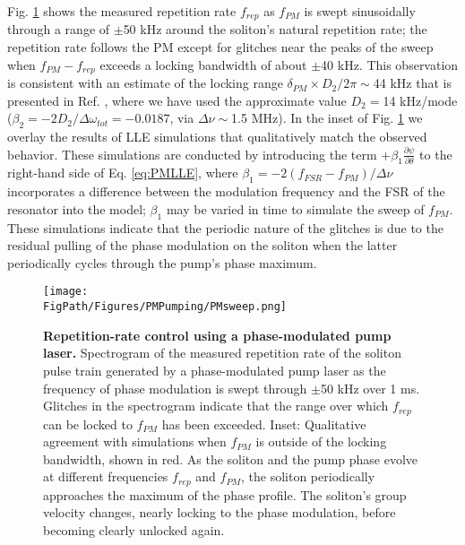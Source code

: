 Fig. \ref{fig:PMsweep} shows the measured repetition rate $f_{rep}$ as $f_{PM}$ is swept sinusoidally through a range of $\pm$50 kHz around the soliton's natural repetition rate; the repetition rate follows the PM except for glitches near the peaks of the sweep when $f_{PM}-f_{rep}$ exceeds a locking bandwidth of about $\pm$40 kHz. This observation is consistent with an estimate of the locking range $\delta_{PM}\times D_2/2\pi\sim$44 kHz that is presented in Ref. \cite{Jang2015a}, where we have used the approximate value $D_2=$14 kHz/mode ($\beta_2=-2D_2/\Delta\omega_{tot}=-0.0187$, via $\Delta\nu\sim$1.5 MHz). In the inset of Fig. \ref{fig:PMsweep} we overlay the results of LLE simulations that qualitatively match the observed behavior. These simulations are conducted by introducing the term $+\beta_1\frac{\partial\psi}{\partial\theta}$ to the right-hand side of Eq. \ref{eq:PMLLE}, where $\beta_1=-2(f_{FSR}-f_{PM})/\Delta\nu$ incorporates a difference between the modulation frequency and the FSR of the resonator into the model; $\beta_1$ may be varied in time to simulate the sweep of $f_{PM}$. These simulations indicate that the periodic nature of the glitches is due to the residual pulling of the phase modulation on the soliton when the latter periodically cycles through the pump's phase maximum.

\begin{figure}[htpb]
	\begin{center}
		\texttt{[image: \\FigPath/Figures/PMPumping/PMsweep.png]}
	\end{center}
	\caption[Repetition-rate control using a phase-modulated pump laser]{\textbf{Repetition-rate control using a phase-modulated pump laser.} Spectrogram of the measured repetition rate of the soliton pulse train generated by a phase-modulated pump laser as the frequency of phase modulation is swept through $\pm$50 kHz over 1 ms. Glitches in the spectrogram indicate that the range over which $f_{rep}$ can be locked to $f_{PM}$ has been exceeded. Inset: Qualitative agreement with simulations when $f_{PM}$ is outside of the locking bandwidth, shown in red. As the soliton and the pump phase evolve at different frequencies $f_{rep}$ and $f_{PM}$, the soliton periodically approaches the maximum of the phase profile. The soliton's group velocity changes, nearly locking to the phase modulation, before becoming clearly unlocked again.}
	\label{fig:PMsweep}
\end{figure} 


